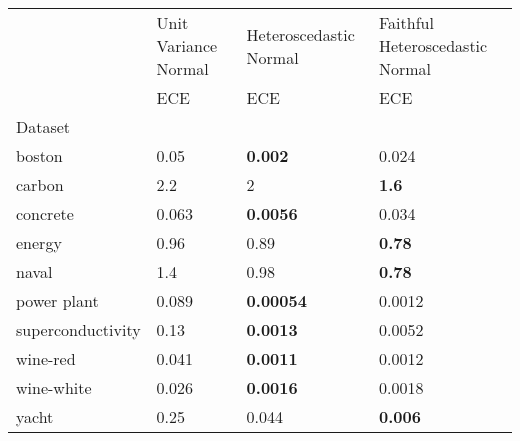 \begin{tabular}{l|l|l|l}
\toprule
 & Unit Variance Normal & Heteroscedastic Normal & Faithful Heteroscedastic Normal \\
 & ECE & ECE & ECE \\
Dataset &  &  &  \\
\midrule
boston & 0.05 & \bfseries 0.002 & 0.024 \\
carbon & 2.2 & 2 & \bfseries 1.6 \\
concrete & 0.063 & \bfseries 0.0056 & 0.034 \\
energy & 0.96 & 0.89 & \bfseries 0.78 \\
naval & 1.4 & 0.98 & \bfseries 0.78 \\
power plant & 0.089 & \bfseries 0.00054 & 0.0012 \\
superconductivity & 0.13 & \bfseries 0.0013 & 0.0052 \\
wine-red & 0.041 & \bfseries 0.0011 & 0.0012 \\
wine-white & 0.026 & \bfseries 0.0016 & 0.0018 \\
yacht & 0.25 & 0.044 & \bfseries 0.006 \\
\bottomrule
\end{tabular}
